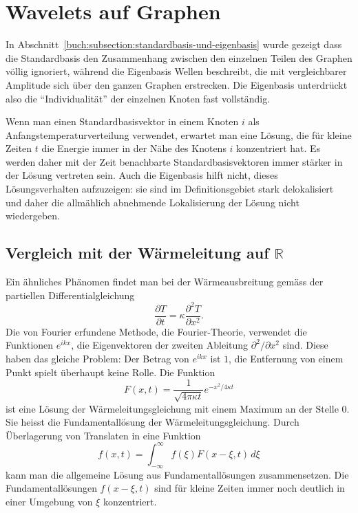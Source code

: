 %
%
%
\section{Wavelets auf Graphen
\label{buch:section:wavelets-auf-graphen}}
In Abschnitt~\ref{buch:subsection:standardbasis-und-eigenbasis} wurde
gezeigt dass die Standardbasis den Zusammenhang zwischen den einzelnen
Teilen des Graphen völlig ignoriert, während die Eigenbasis Wellen
beschreibt, die mit vergleichbarer Amplitude sich über den ganzen
Graphen erstrecken.
Die Eigenbasis unterdrückt also die ``Individualität'' der einzelnen
Knoten fast vollständig.

Wenn man einen Standardbasisvektor in einem Knoten $i$
als Anfangstemperaturverteilung verwendet, erwartet man eine Lösung,
die für kleine Zeiten $t$ die Energie immer in der Nähe des Knotens $i$
konzentriert hat.
Es werden daher mit der Zeit benachbarte Standardbasisvektoren
immer stärker in der Lösung vertreten sein.
Auch die Eigenbasis hilft nicht, dieses Lösungsverhalten aufzuzeigen:
sie sind im Definitionsgebiet stark delokalisiert und daher die allmählich
abnehmende Lokalisierung der Lösung nicht wiedergeben.

\subsection{Vergleich mit der Wärmeleitung auf $\mathbb{R}$}
Ein ähnliches Phänomen findet man bei der Wärmeausbreitung gemäss
der partiellen Differentialgleichung
\[
\frac{\partial T}{\partial t} = \kappa \frac{\partial^2 T}{\partial x^2}.
\]
Die von Fourier erfundene Methode, die Fourier-Theorie, verwendet die
Funktionen $e^{ik x}$, die Eigenvektoren der zweiten Ableitung
$\partial^2/\partial x^2$ sind.
Diese haben das gleiche Problem: Der Betrag von $e^{ikx}$ ist $1$, die
Entfernung von einem Punkt spielt überhaupt keine Rolle.
Die Funktion
\[
F(x,t)
=
\frac{1}{\sqrt{4\pi\kappa t}}e^{-x^2/4\kappa t}
\]
ist eine Lösung der Wärmeleitungsgleichung mit einem Maximum an
der Stelle $0$.
Sie heisst die Fundamentallösung der Wärmeleitungsgleichung.
Durch Überlagerung von Translaten in eine Funktion
\begin{equation}
f(x,t)
=
\int_{-\infty}^\infty f(\xi) F(x-\xi,t)\,d\xi
\label{buch:graphen:eqn:fundamentalueberlagerung}
\end{equation}
kann man die allgemeine Lösung aus Fundamentallösungen zusammensetzen.
Die Fundamentallösungen $f(x-\xi,t)$ sind für kleine Zeiten immer noch
deutlich in einer Umgebung von $\xi$ konzentriert.

